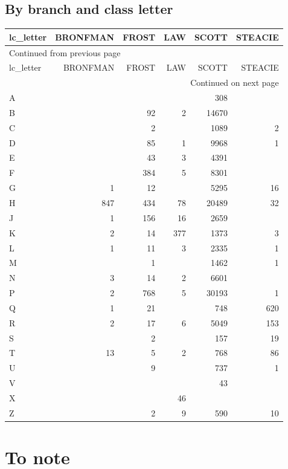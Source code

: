 \documentclass[11pt]{article}
\begin{document}
\subsection*{By branch and class letter}
\label{sec:org034542a}

\begin{longtable}{lrrrrr}
lc\_letter & BRONFMAN & FROST & LAW & SCOTT & STEACIE\\
\hline
\endfirsthead
\multicolumn{6}{l}{Continued from previous page} \\
\hline

lc\_letter & BRONFMAN & FROST & LAW & SCOTT & STEACIE \\

\hline
\endhead
\hline\multicolumn{6}{r}{Continued on next page} \\
\endfoot
\endlastfoot
\hline
A &  &  &  & 308 & \\
B &  & 92 & 2 & 14670 & \\
C &  & 2 &  & 1089 & 2\\
D &  & 85 & 1 & 9968 & 1\\
E &  & 43 & 3 & 4391 & \\
F &  & 384 & 5 & 8301 & \\
G & 1 & 12 &  & 5295 & 16\\
H & 847 & 434 & 78 & 20489 & 32\\
J & 1 & 156 & 16 & 2659 & \\
K & 2 & 14 & 377 & 1373 & 3\\
L & 1 & 11 & 3 & 2335 & 1\\
M &  & 1 &  & 1462 & 1\\
N & 3 & 14 & 2 & 6601 & \\
P & 2 & 768 & 5 & 30193 & 1\\
Q & 1 & 21 &  & 748 & 620\\
R & 2 & 17 & 6 & 5049 & 153\\
S &  & 2 &  & 157 & 19\\
T & 13 & 5 & 2 & 768 & 86\\
U &  & 9 &  & 737 & 1\\
V &  &  &  & 43 & \\
X &  &  & 46 &  & \\
Z &  & 2 & 9 & 590 & 10\\
\end{longtable}

\section*{To note}
\label{sec:org0d60521}
\end{document}
